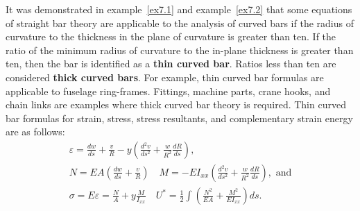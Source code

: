 \documentclass{AeroStructure-ERJohnson}
\begin{document}
It was demonstrated in example~\ref{ex7.1} and example~\ref{ex7.2} that some equations of straight bar theory are applicable to the analysis of curved bars if the radius of curvature to the thickness in the plane of curvature is greater than ten. If the ratio of the minimum radius of curvature to the in-plane thickness is greater than ten, then the bar is identified as a \textbf{thin curved bar}. Ratios less than ten are considered \textbf{thick curved bars}. For example, thin curved bar formulas are applicable to fuselage ring-frames. Fittings, machine parts, crane hooks, and chain links are examples where thick curved bar theory is required. Thin curved bar formulas for strain, stress, stress resultants, and complementary strain energy are as follows:\vspace*{-6pt}
\begin{gather}
\varepsilon=\frac{d w}{d s}+\frac{v}{R}-y\left(\frac{d^{2} v}{d s^{2}}+\frac{w}{R^{2}} \frac{d R}{d s}\right), \label{eq7.27} \\
N=E A\left(\frac{d w}{d s}+\frac{v}{R}\right) \quad M=-E I_{x x}\left(\frac{d^{2} v}{d s^{2}}+\frac{w}{R^{2}} \frac{d R}{d s}\right), \textrm{ and} \label{eq7.28} \\
\sigma=E \varepsilon=\frac{N}{A}+y \frac{M}{I_{x x}} \quad U^{*}=\frac{1}{2} \int\left(\frac{N^{2}}{E A}+\frac{M^{2}}{E I_{x x}}\right) d s. \label{eq7.29}
\end{gather}
\end{document}
